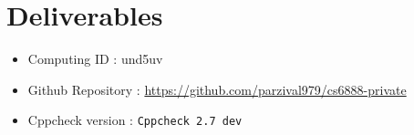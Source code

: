 \documentclass[conference]{IEEEtran}
\begin{document}


\section{Deliverables}
\begin{itemize}
    \item Computing ID : und5uv
    \item Github Repository : \url{https://github.com/parzival979/cs6888-private}
    \item Cppcheck version : \verb|Cppcheck 2.7 dev|
\end{itemize}



\end{document}
